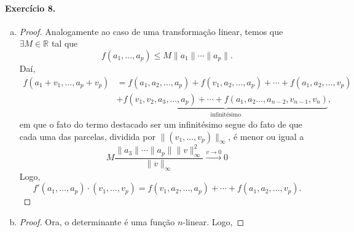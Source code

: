 \documentclass[12pt,a4paper]{article}
\newcommand{\R}{\mathbb{R}}
\begin{document}
\paragraph{Exercício 8.}
%
    \begin{enumerate}[a)]
        \item 
        \begin{proof}
            Analogamente ao caso de uma transformação linear, temos que $\exists M\in\R$ tal que
            \begin{equation*}
                f(a_1, \dots, a_p) \leq M\|a_1\|\cdots\|a_p\|.
            \end{equation*}
            Daí,
            \begin{align*}
                f(a_1 + v_1, \dots, a_p + v_p) &= f(a_1, a_2,\dots, a_p) 
                                               + f(v_1,a_2, \dots, a_p) 
                                               + \cdots 
                                               + f(a_1, a_2, \dots, v_p) \\
                                               &+ \underbrace{f(v_1, v_2, a_3, \dots, a_p) 
                                               + \cdots 
                                               + f(a_1, a_2\dots, a_{n-2}, v_{n-1},v_n)}_{
                                               \text{infinitésimo}},
            \end{align*}
            em que o fato do termo destacado ser um infinitésimo segue do fato de que cada uma das parcelas,
            dividida por $\|(v_1, \dots, v_p)\|_{\infty}$, é menor ou igual a
            \begin{equation*}
                M\frac{\|a_3\|\cdots\|a_p\|\|v\|^2_{\infty}}{\|v\|_{\infty}} \xrightarrow{v\to 0} 0
            \end{equation*}
            Logo, 
            \begin{equation*}
                f'(a_1, \dots, a_p)\cdot (v_1, \dots, v_p) = f(v_1, a_2, \dots, a_p) 
                                                           + \cdots 
                                                           + f(a_1, a_2, \dots, v_p).
            \end{equation*}
        \end{proof}
        \item
        \begin{proof}
            Ora, o determinante é uma função $n$-linear. Logo, 

\end{proof}
\end{enumerate}
\end{document}
